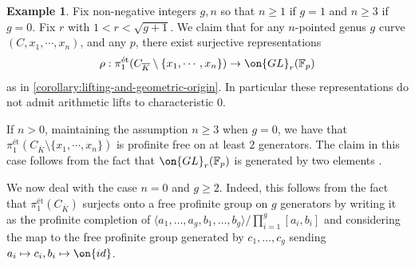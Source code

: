 \documentclass[12 pt]{amsart}
\theoremstyle{plain}
\theoremstyle{definition}
\newtheorem{example}[subsubsection]{Example}
\theoremstyle{remark}
\numberwithin{equation}{section}
\begin{document}
\begin{example}
	\label{example:non-liftable-representations}
	Fix non-negative integers $g,n$ so that $n \geq 1$ if $g =1$ and $n\geq
	3$ if $g = 0$.
	Fix $r$ with $1<r<\sqrt{g+1}$. We claim
	that for any $n$-pointed genus $g$ curve $(C, x_1, \cdots, x_n)$, and any $p$,
	there exist surjective representations $$\rho:
	\pi_1^{\text{\'et}}(C_{\overline{K}}\setminus\{x_1, \cdots, x_n\})\to
	\on{GL}_r(\mathbb{F}_p)$$ as in \autoref{corollary:lifting-and-geometric-origin}. 
	In particular these representations do not admit arithmetic lifts to
	characteristic $0$.

	If $n > 0$, maintaining the assumption $n \geq 3$ when $g = 0$, we have
	that
$\pi_1^{\text{\'et}}(C_{\overline{K}}\setminus\{x_1, \cdots, x_n\})$ is
profinite free on at least $2$ generators.
The claim in this case follows from the fact that $\on{GL}_r(\mathbb{F}_p)$ is generated by two elements
\cite{waterhouse:two-generators}. 

We now deal with the case $n =0$ and $g \geq 2$.
Indeed, this follows from the fact that
$\pi_1^{\text{\'et}}(C_{\overline{K}})$ surjects onto a free profinite group on
$g$ generators by writing it as the profinite completion of $\langle a_1, \ldots,
a_g, b_1, \ldots, b_g \rangle/ \prod_{i=1}^g [a_i, b_i]$ and considering the map
to the free profinite group generated by $c_1, \ldots, c_g$ sending $a_i \mapsto
c_i, b_i \mapsto \on{id}$.
\end{example}
\end{document}
